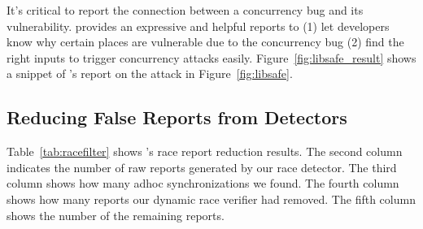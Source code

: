 
It's critical to report the connection between a concurrency bug and its vulnerability.
\xxx provides an expressive and helpful reports to (1) let developers know why
certain places are vulnerable due to the concurrency bug (2) find the right inputs to trigger
concurrency attacks easily. Figure~\ref{fig:libsafe_result} shows a snippet of \xxx's
report on the \libsafe attack in Figure~\ref{fig:libsafe}.


\subsection{Reducing False Reports from Detectors}\label{sec:reduce}


Table~\ref{tab:racefilter} shows \xxx's race report reduction results. The 
second
column indicates the number of raw reports generated by our race detector.
The third column shows how many adhoc synchronizations we found.
The fourth column shows how many reports
our dynamic race verifier had removed. The fifth column shows the number of the 
remaining reports.


